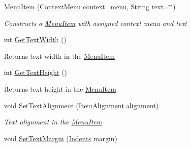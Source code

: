 \begin{DoxyCompactItemize}
\mbox{\hyperlink{class_space_v_i_l_1_1_menu_item_aebcbfeda9a1adfecfe1c788316b5280b}{Menu\+Item}} (\mbox{\hyperlink{class_space_v_i_l_1_1_context_menu}{Context\+Menu}} context\+\_\+menu, String text=\char`\"{}\char`\"{})
\begin{DoxyCompactList}\small\item\em Constructs a \mbox{\hyperlink{class_space_v_i_l_1_1_menu_item}{Menu\+Item}} with assigned context menu and text \end{DoxyCompactList}\item 
\mbox{\label{class_space_v_i_l_1_1_menu_item_ae459b1ee3bbd50feeda3fbd72fc88b3a}} 
int \mbox{\hyperlink{class_space_v_i_l_1_1_menu_item_ae459b1ee3bbd50feeda3fbd72fc88b3a}{Get\+Text\+Width}} ()
\begin{DoxyCompactList}\small\item\em \begin{DoxyReturn}{Returns}
text width in the \mbox{\hyperlink{class_space_v_i_l_1_1_menu_item}{Menu\+Item}} 
\end{DoxyReturn}
\end{DoxyCompactList}\item 
\mbox{\label{class_space_v_i_l_1_1_menu_item_aabeee3bdbc0be8c86c4a28daea1e3f08}} 
int \mbox{\hyperlink{class_space_v_i_l_1_1_menu_item_aabeee3bdbc0be8c86c4a28daea1e3f08}{Get\+Text\+Height}} ()
\begin{DoxyCompactList}\small\item\em \begin{DoxyReturn}{Returns}
text height in the \mbox{\hyperlink{class_space_v_i_l_1_1_menu_item}{Menu\+Item}} 
\end{DoxyReturn}
\end{DoxyCompactList}\item 
void \mbox{\hyperlink{class_space_v_i_l_1_1_menu_item_a04dea3a18d50459b3a5bd25c4421f56b}{Set\+Text\+Alignment}} (Item\+Alignment alignment)
\begin{DoxyCompactList}\small\item\em Text alignment in the \mbox{\hyperlink{class_space_v_i_l_1_1_menu_item}{Menu\+Item}} \end{DoxyCompactList}\item 
void \mbox{\hyperlink{class_space_v_i_l_1_1_menu_item_a91be48e8848efeafce18980725031e09}{Set\+Text\+Margin}} (\mbox{\hyperlink{struct_space_v_i_l_1_1_decorations_1_1_indents}{Indents}} margin)

\end{DoxyCompactItemize}
